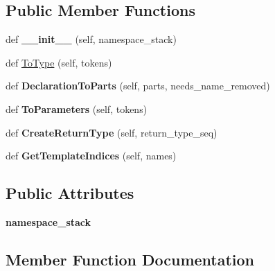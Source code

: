 \subsection*{Public Member Functions}
\begin{DoxyCompactItemize}
\item 
\mbox{\label{classcpp_1_1ast_1_1_type_converter_ae6e75773d6722cdbb96d510a49cb633a}} 
def {\bfseries \+\_\+\+\_\+init\+\_\+\+\_\+} (self, namespace\+\_\+stack)
\item 
def \hyperlink{classcpp_1_1ast_1_1_type_converter_aa6ea82e40cd30e5dfcd471ff144a19cf}{To\+Type} (self, tokens)
\item 
\mbox{\label{classcpp_1_1ast_1_1_type_converter_a7c9d20d107c2bc0eb80afdf04957825f}} 
def {\bfseries Declaration\+To\+Parts} (self, parts, needs\+\_\+name\+\_\+removed)
\item 
\mbox{\label{classcpp_1_1ast_1_1_type_converter_aeaf27fb1890f65d7216703df610b46d5}} 
def {\bfseries To\+Parameters} (self, tokens)
\item 
\mbox{\label{classcpp_1_1ast_1_1_type_converter_a7e4d429131d9d5742ec44c78b61beb87}} 
def {\bfseries Create\+Return\+Type} (self, return\+\_\+type\+\_\+seq)
\item 
\mbox{\label{classcpp_1_1ast_1_1_type_converter_a7b5244be5a0caedd769ae866f8a182aa}} 
def {\bfseries Get\+Template\+Indices} (self, names)
\end{DoxyCompactItemize}
\subsection*{Public Attributes}
\begin{DoxyCompactItemize}
\item 
\mbox{\label{classcpp_1_1ast_1_1_type_converter_abb739f15c6cd0800e07c086c2b30833e}} 
{\bfseries namespace\+\_\+stack}
\end{DoxyCompactItemize}


\subsection{Member Function Documentation}
\mbox{\label{classcpp_1_1ast_1_1_type_converter_aa6ea82e40cd30e5dfcd471ff144a19cf}} 
